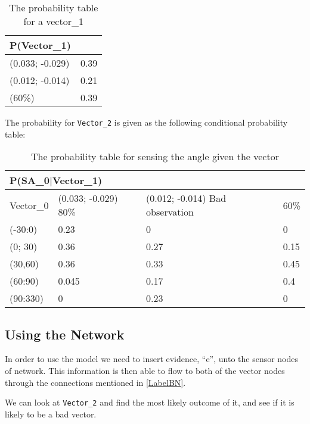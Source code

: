 \begin{center}
\begin{table}[H]
\label{Vector0_table}
\begin{tabular}{|l|l|}
\hline
P(Vector\_1) &\\ \hline
(0.033; -0.029) & 0.39   \\ \hline 
(0.012; -0.014) & 0.21  \\ \hline
(60\%)   & 0.39  \\ \hline
\end{tabular}
\caption{The probability table for a vector\_1}
\end{table}
\end{center}

The probability for \texttt{Vector\_2} is given as the following conditional
probability table: 
\begin{center}
\begin{table}[H]
\label{SAtable}
\begin{tabular}{|l|l|l|l|}
\hline
\multicolumn{4}{|l|}{P(SA\_0|Vector\_1)} \\ \hline
Vector\_0     & (0.033; -0.029) 80\% & (0.012; -0.014) Bad observation & 60\%  \\\hline 
(-30:0)   & 0.23 & 0    & 0    \\ \hline 
(0; 30)    & 0.36 & 0.27 & 0.15    \\ \hline
(30,60)   & 0.36    & 0.33 & 0.45   \\ \hline
(60:90)   & 0.045	& 0.17 & 0.4 	\\ \hline
(90:330)  & 0	& 	0.23		& 0 		\\ \hline
\end{tabular}
\caption{The probability table for sensing the angle given the vector}
\end{table}
\end{center}


\subsection{Using the Network}

In order to use the model we need to insert evidence, ``e'', unto the sensor
nodes of network. This information is then able to flow to both of the vector
nodes through the connections mentioned in \autoref{LabelBN}.


We can look at \texttt{Vector\_2} and find the most likely outcome of it, and
see if it is likely to be a bad vector.



